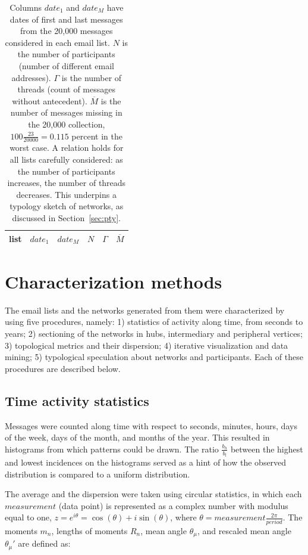 \documentclass[%
 aip,
 jmp,%
 amsmath,amssymb,
 reprint,%
]{revtex4-1}
\begin{document}
\begin{table}
  \centering
  \caption{Columns $date_1$ and $date_M$ have dates of first and last messages from the 20,000 messages considered in each email list.
$N$ is the number of participants (number of different email addresses).
$\Gamma$ is the number of threads (count of messages without antecedent).
$\overline{M}$ is the number of messages missing in the 20,000 collection, $100\frac{23}{20000}=0.115$ percent in the worst case.
A relation holds for all lists carefully considered: as the number of participants increases, the number of threads decreases.
This underpins a typology sketch of networks, as discussed in Section~\ref{sec:pty}.}
  \label{tab:genLists}
  \begin{tabular}{|l|c|c|c|c|c|}\hline
list & $date_1$ & $date_{M}$    & $N$  & $\Gamma$ & $\overline{M}$ \\\hline
	  
  \end{tabular}
\end{table}


\section{Characterization methods}\label{sec:carac}
The email lists and the networks generated from them were characterized by using five procedures, namely: 1) statistics of activity along time, from seconds to years; 2) sectioning of the networks in hubs, intermediary and peripheral vertices; 3) topological metrics and their dispersion; 4) iterative visualization and data mining; 5) typological speculation about networks and participants.
Each of these procedures are described below.


\subsection{Time activity statistics}\label{sec:mtime}
  Messages were counted along time with respect to seconds, minutes, hours, days of the week, days of the month, and months of the year. This resulted in histograms from which patterns could be drawn. The ratio $\frac{b_h}{b_l}$ between the highest and lowest incidences on the histograms served as a hint of how the observed distribution is compared to a uniform distribution.
  
  The average and the dispersion were taken using circular statistics, in which each $measurement$ (data point) is represented as a complex number with modulus equal to one, $z=e^{i\theta}=\cos(\theta)+i\sin(\theta)$, where $\theta=measurement\frac{2\pi}{period}$. The moments $m_n$, lengths of moments $R_n$, mean angle $\theta_\mu$, and rescaled mean angle $\theta_\mu'$ are defined as:
\end{document}
